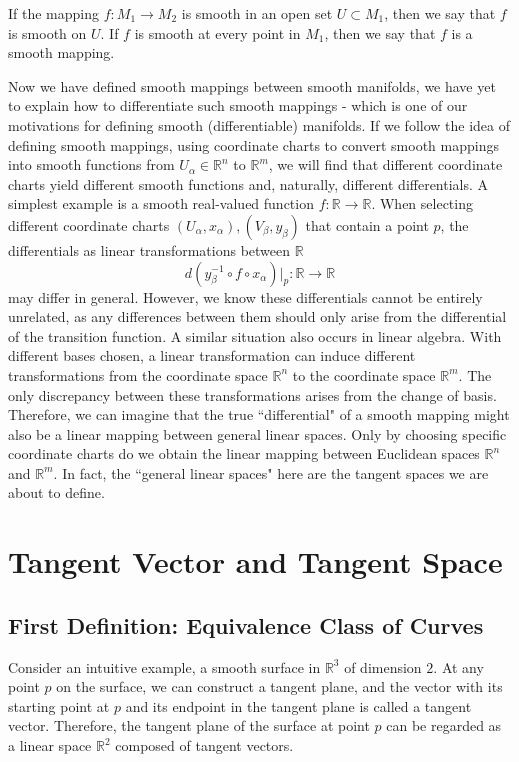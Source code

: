 \documentclass{report}
\begin{document}
If the mapping $f:M_1\to M_2$ is smooth in an open set $U\subset M_1$, then we say that $f$ is smooth on $U$. If $f$ is smooth at every point in $M_1$, then we say that $f$ is a smooth mapping.

Now we have defined smooth mappings between smooth manifolds, we have yet to explain how to differentiate such smooth mappings - which is one of our motivations for defining smooth (differentiable) manifolds. If we follow the idea of defining smooth mappings, using coordinate charts to convert smooth mappings into smooth functions from $U_\alpha\in\mathbb{R}^n$ to $\mathbb{R}^m$, we will find that different coordinate charts yield different smooth functions and, naturally, different differentials. A simplest example is a smooth real-valued function $f:\mathbb{R}\to\mathbb{R}$. When selecting different coordinate charts $(U_\alpha,x_\alpha),(V_\beta,y_\beta)$ that contain a point $p$, the differentials as linear transformations between $\mathbb{R}$
$$
d(y^{-1}_\beta \circ f\circ x_\alpha)|_p:\mathbb{R}\longrightarrow\mathbb{R}
$$
may differ in general. However, we know these differentials cannot be entirely unrelated, as any differences between them should only arise from the differential of the transition function. A similar situation also occurs in linear algebra. With different bases chosen, a linear transformation can induce different transformations from the coordinate space $\mathbb{R}^n$ to the coordinate space $\mathbb{R}^m$. The only discrepancy between these transformations arises from the change of basis. Therefore, we can imagine that the true ``differential" of a smooth mapping might also be a linear mapping between general linear spaces. Only by choosing specific coordinate charts do we obtain the linear mapping between Euclidean spaces $\mathbb{R}^n$ and $\mathbb{R}^m$. In fact, the ``general linear spaces" here are the tangent spaces we are about to define.

\section{Tangent Vector and Tangent Space}
\subsection{First Definition: Equivalence Class of Curves}
Consider an intuitive example, a smooth surface in $\mathbb{R}^3$ of dimension $2$. At any point $p$ on the surface, we can construct a tangent plane, and the vector with its starting point at $p$ and its endpoint in the tangent plane is called a tangent vector. Therefore, the tangent plane of the surface at point $p$ can be regarded as a linear space $\mathbb{R}^2$ composed of tangent vectors.
\end{document}
